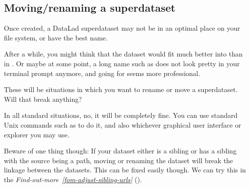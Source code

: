 \subsection{Moving/renaming a superdataset}
\label{\detokenize{basics/101-136-filesystem:moving-renaming-a-superdataset}}
\sphinxAtStartPar
Once created, a DataLad superdataset may not be in an optimal
place on your file system, or have the best name.

\sphinxAtStartPar
After a while, you might think that the dataset would fit much
better into  than in
. Or maybe at
some point, a long name such as 
does not look pretty in your terminal prompt anymore, and going for
 seems more professional.

\sphinxAtStartPar
These will be situations in which you want to rename or move
a superdataset. Will that break anything?

\sphinxAtStartPar
In all standard situations, no, it will be completely fine.
You can use standard Unix commands such as  to do it,
and also whichever graphical user interface or explorer you may
use.

\sphinxAtStartPar
Beware of one thing though: If your dataset either is a sibling
or has a sibling with the source being a path, moving or renaming
the dataset will break the linkage between the datasets. This can
be fixed easily though. We can try this in the \textit{Find-out-more}~{\findoutmoreiconinline}\textit{\ref{fom-adjust-sibling-urls}} {\hyperref[\detokenize{basics/101-136-filesystem:fom-adjust-sibling-urls}]{}} ().

